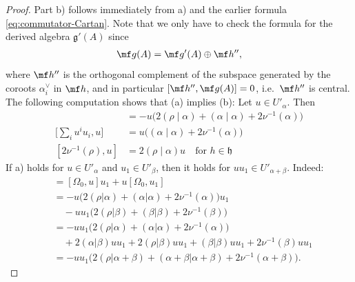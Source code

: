 \documentclass[12pt]{article}
\begin{document}
\begin{proof}
    Part b) follows immediately from a) and the earlier formula \ref{eq:commutator-Cartan}. Note that we only have to check the formula for the derived algebra $\mathfrak{g}'(A)$ since \begin{align*}
        \mf g(A) = \mf g'(A) \oplus \mf h'',
    \end{align*} where $\mf h''$ is the orthogonal complement of the subspace generated by the coroots $\alpha_i^\vee$ in $\mf h$, and in particular $[\mf h'',\mf g(A)]=0$, i.e.\ $\mf h''$ is central.
    The following computation shows that (a) implies (b): Let $u \in U'_\alpha$. Then
    \begin{align*}
        [\Omega_0,u]                & = -u\big(2(\rho \mid \alpha) + (\alpha \mid \alpha) + 2\nu^{-1}(\alpha)\big) \\
        \Big[\sum_i u^i u_i, u\Big] & = u\big((\alpha \mid \alpha) + 2\nu^{-1}(\alpha)\big)                        \\
        [2\nu^{-1}(\rho),u]         & = 2(\rho \mid \alpha)u \quad \text{for } h \in \mathfrak{h}
    \end{align*}
    If a) holds for $u \in U'_\alpha$ and $u_1 \in U'_\beta$, then it holds for $uu_1 \in U'_{\alpha+\beta}$. Indeed:
    \begin{align*}
        [\Omega_0,uu_1] & = [\Omega_0,u]u_1 + u[\Omega_0,u_1]                                                            \\
                        & = -u\big(2(\rho|\alpha) + (\alpha|\alpha) + 2\nu^{-1}(\alpha)\big)u_1                          \\
                        & \quad -uu_1\big(2(\rho|\beta) + (\beta|\beta) + 2\nu^{-1}(\beta)\big)                          \\
                        & = -uu_1\big(2(\rho|\alpha) + (\alpha|\alpha) + 2\nu^{-1}(\alpha)\big)                          \\
                        & \quad + 2(\alpha|\beta)u u_1 + 2(\rho|\beta)uu_1 + (\beta|\beta)uu_1 + 2\nu^{-1}(\beta)uu_1    \\
                        & = -uu_1\big(2(\rho|\alpha+\beta) + (\alpha+\beta|\alpha+\beta) + 2\nu^{-1}(\alpha+\beta)\big).
    \end{align*}


\end{proof}
\end{document}
